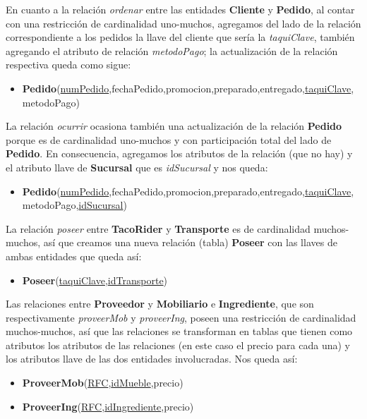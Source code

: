 \documentclass[11pt,letterpaper]{article}
\begin{document}
En cuanto a la relación \textit{ordenar} entre las entidades \textbf{Cliente} y \textbf{Pedido}, al contar con una restricción de cardinalidad uno-muchos, agregamos del lado de la relación correspondiente a los pedidos la llave del cliente que sería la \textit{taquiClave}, también agregando el atributo de relación \textit{metodoPago}; la actualización de la relación respectiva queda como sigue:

\begin{itemize}
\item \footnotesize{\textbf{Pedido}(\underline{numPedido},fechaPedido,promocion,preparado,entregado,\underline{taquiClave},metodoPago)}
\end{itemize}

La relación \textit{ocurrir} ocasiona también una actualización de la relación \textbf{Pedido} porque es de cardinalidad uno-muchos y con participación total del lado de \textbf{Pedido}. En consecuencia, agregamos los atributos de la relación (que no hay) y el atributo llave de \textbf{Sucursal} que es \textit{idSucursal} y nos queda:



\begin{itemize}
\item \footnotesize{\textbf{Pedido}(\underline{numPedido},fechaPedido,promocion,preparado,entregado,\underline{taquiClave},metodoPago,\underline{idSucursal})}
\end{itemize}

La relación \textit{poseer} entre \textbf{TacoRider} y \textbf{Transporte} es de cardinalidad muchos-muchos, así que creamos una nueva relación (tabla) \textbf{Poseer} con las llaves de ambas entidades que queda así:

\begin{itemize}
\item \footnotesize{\textbf{Poseer}(\underline{taquiClave},\underline{idTransporte})}
\end{itemize}

Las relaciones entre \textbf{Proveedor} y \textbf{Mobiliario} e \textbf{Ingrediente}, que son respectivamente \textit{proveerMob} y \textit{proveerIng}, poseen una restricción de cardinalidad muchos-muchos, así que las relaciones se transforman en tablas que tienen como atributos los atributos de las relaciones (en este caso el precio para cada una) y los atributos llave de las dos entidades involucradas. Nos queda así:

\begin{itemize}
\item \footnotesize{\textbf{ProveerMob}(\underline{RFC},\underline{idMueble},precio)}
\item \footnotesize{\textbf{ProveerIng}(\underline{RFC},\underline{idIngrediente},precio)}
\end{itemize}
\end{document}
